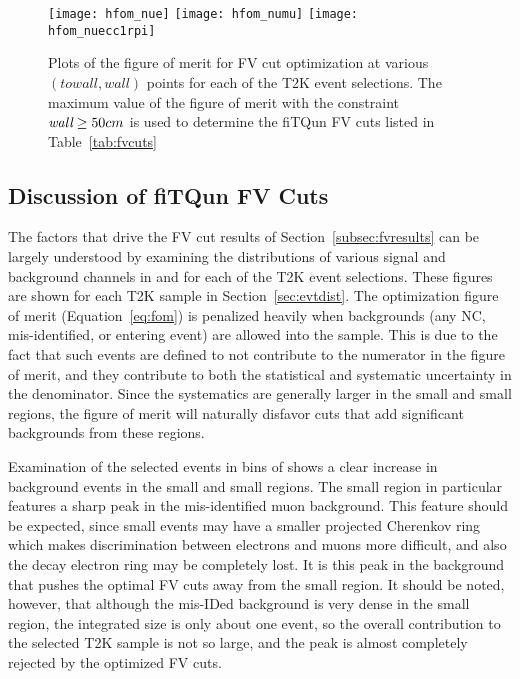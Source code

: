 \begin{figure}[h]
  \begin{center}
    \texttt{[image: hfom\_nue]}
    \texttt{[image: hfom\_numu]}
    \texttt{[image: hfom\_nuecc1rpi]}
  \end{center}
  \caption{Plots of the figure of merit for FV cut optimization at various
  $(towall,wall)$ points for each of the T2K event selections. The maximum value of the figure of merit with the
  constraint $\emph{wall} \geq 50 cm$ is used to determine the fiTQun FV cuts listed in
  Table~\ref{tab:fvcuts}}
  \label{fig:fom}
\end{figure}



\subsection{Discussion of fiTQun FV Cuts}
\label{subsec:fvdiscuss}

The factors that drive the FV cut results of Section~\ref{subsec:fvresults} can
be largely understood by examining the distributions of various signal
and background channels in \wall and \towall for each of the T2K event
selections.  These figures are shown for each T2K sample in Section~\ref{sec:evtdist}.
The optimization figure of merit (Equation~\ref{eq:fom}) is
penalized heavily when backgrounds (any NC, mis-identified, or entering event)
are allowed into the sample.  This is due to the fact that such events are
defined to not contribute to the numerator in the figure of merit, and they
contribute to both the statistical and systematic uncertainty in the
denominator. Since the systematics are generally larger in the
small \wall and small \towall regions, the figure of merit will naturally
disfavor cuts that add significant backgrounds from these regions.  

Examination of the selected \nue events in bins of \towall shows a clear
increase in background events in the small \towall and small \wall regions.
The small \towall region in particular features a sharp peak in the
mis-identified muon background.  This feature should be expected, since small
\towall events may have a smaller projected Cherenkov ring which makes
discrimination between electrons and muons more difficult, and also the decay
electron ring may be completely lost. It is this peak in the background that pushes
the optimal FV cuts away from the small \towall region.  It should be noted,
however, that although the mis-IDed background is very dense in the small
\towall region, the integrated size is only about one event, so the overall
contribution to the selected \nue T2K sample is not so large, and the peak
is almost completely rejected by the optimized FV cuts.

